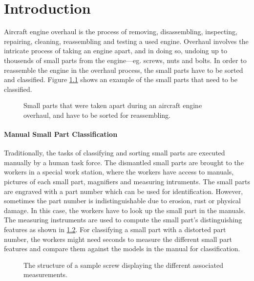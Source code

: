 \chapter{Introduction}\label{ch:introduction}

Aircraft engine overhaul is the process of removing, disassembling, inspecting, repairing, cleaning, reassembling and testing a used engine. Overhaul involves the intricate process of taking an engine apart, and in doing so, undoing up to thousends of small parts from the engine—eg. screws, nuts and bolts. In order to reassemble the engine in the overhaul process, the small parts have to be sorted and classified. Figure \ref{fig:unclassified_small_parts} shows an example of the small parts that need to be classified.

\begin{figure}[H]
\centering
{}
\caption{Small parts that were taken apart during an aircraft engine overhaul, and have to be sorted for reassembling.}
\label{fig:unclassified_small_parts}
\end{figure}

\subsubsection{Manual Small Part Classification}

Traditionally, the tasks of classifying and sorting small parts are executed manually by a human task force. The dismantled small parts are brought to the workers in a special work station, where the workers have access to manuals, pictures of each small part, magnifiers and measuring intruments. The small parts are engraved with a part number which can be used for identification. However, sometimes the part number is indistinguishable due to erosion, rust or physical damage. In this case, the workers have to look up the small part in the manuals. The measuring instruments are used to compute the small part's distinguishing features as shown in \ref{fig:small_part_structure}. For classifying a small part with a distorted part number, the workers might need seconds to measure the different small part features and compare them against the models in the manual for classification.

\begin{figure}[H]
\centering
{}
\caption{The structure of a sample screw displaying the different associated measurements.}
\label{fig:small_part_structure}
\end{figure}

